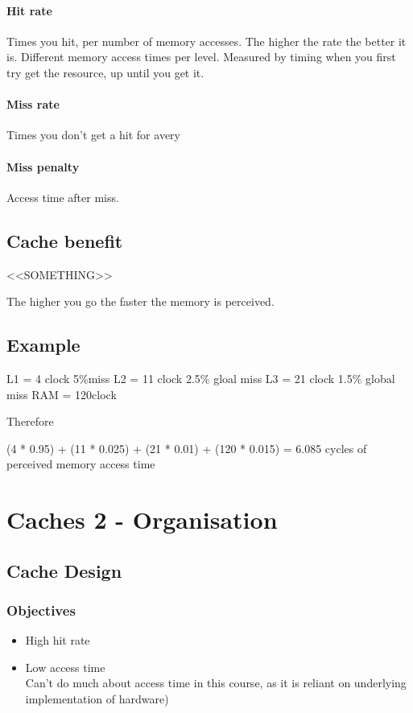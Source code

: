 \documentclass{article}
\begin{document}
		\paragraph{Hit rate}
		Times you hit, per number of memory accesses. The higher the rate the better it is. Different memory access times per level. Measured by timing when you first try get the resource, up until you get it.

		\paragraph{Miss rate}
		Times you don't get a hit for avery 

		\paragraph{Miss penalty}
		Access time after miss.

	\subsection*{Cache benefit}
		<<SOMETHING>>

		The higher you go the faster the memory is perceived.

	\subsection*{Example}
		L1 = 4 clock	5\%miss
		L2 = 11 clock	2.5\% gloal miss
		L3 = 21 clock	1.5\% global miss
		RAM = 120clock

		Therefore

		(4 * 0.95) + (11 * 0.025) + (21 * 0.01) + (120 * 0.015) = 6.085 cycles of perceived memory access time

\section*{Caches 2 - Organisation}
	\subsection*{Cache Design}
		\subsubsection*{Objectives}
		\begin{itemize}
			\item High hit rate
			\item Low access time\\
			Can't do much about access time in this course, as it is reliant on underlying implementation of hardware)
		\end{itemize}
\end{document}
